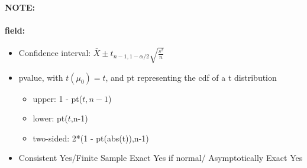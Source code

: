 \documentclass[12pt]{article}
\newenvironment{note}{\paragraph{NOTE:}}{}
\newenvironment{field}{\paragraph{field:}}{}
\begin{document}
\begin{note}
\begin{field}
\begin{itemize}
              \item Confidence interval: $\bar{X} \pm t_{n-1,1-\alpha/2}\sqrt{\frac{s^2}{n}}$
              \item pvalue, with $t(\mu_0)  = t$, and pt representing the cdf of a t distribution
              \begin{itemize}
                \item upper: 1 - pt($t,n-1$)
                \item lower: pt($t$,n-1)
                \item two-sided: 2*(1 - pt(abs(t)),n-1)
              \end{itemize}
              \item Consistent Yes/Finite Sample Exact Yes if normal/ Asymptotically Exact Yes
            \end{itemize}
    \end{field}
\end{note}
\end{document}
